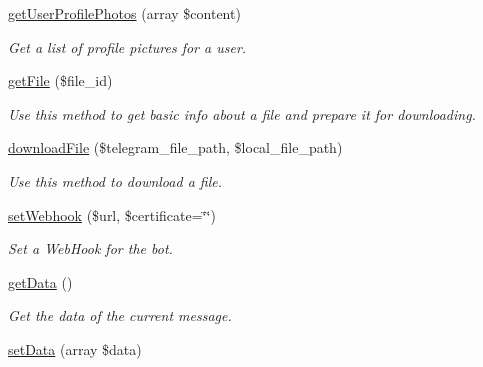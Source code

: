 \begin{DoxyCompactItemize}
\hyperlink{class_telegram_af2245dc488830eb7add02c35e8dcf492}{get\+User\+Profile\+Photos} (array \$content)
\begin{DoxyCompactList}\small\item\em Get a list of profile pictures for a user. \end{DoxyCompactList}\item 
\hyperlink{class_telegram_acb201ffc034063cfd347962c49ad5ad9}{get\+File} (\$file\+\_\+id)
\begin{DoxyCompactList}\small\item\em Use this method to get basic info about a file and prepare it for downloading. \end{DoxyCompactList}\item 
\hyperlink{class_telegram_af08c6bc7982d71857f05c0756221a703}{download\+File} (\$telegram\+\_\+file\+\_\+path, \$local\+\_\+file\+\_\+path)
\begin{DoxyCompactList}\small\item\em Use this method to download a file. \end{DoxyCompactList}\item 
\hyperlink{class_telegram_ae94b55864cae3e7751e7293585eec9f5}{set\+Webhook} (\$url, \$certificate=\char`\"{}\char`\"{})
\begin{DoxyCompactList}\small\item\em Set a Web\+Hook for the bot. \end{DoxyCompactList}\item 
\hyperlink{class_telegram_a81a67162a6288d78fc4c55283325f0b4}{get\+Data} ()
\begin{DoxyCompactList}\small\item\em Get the data of the current message. \end{DoxyCompactList}\item 
\hypertarget{class_telegram_a87449bdd364c33ff024d32896342bf31}{}\hyperlink{class_telegram_a87449bdd364c33ff024d32896342bf31}{set\+Data} (array \$data)\label{class_telegram_a87449bdd364c33ff024d32896342bf31}


\end{DoxyCompactItemize}
